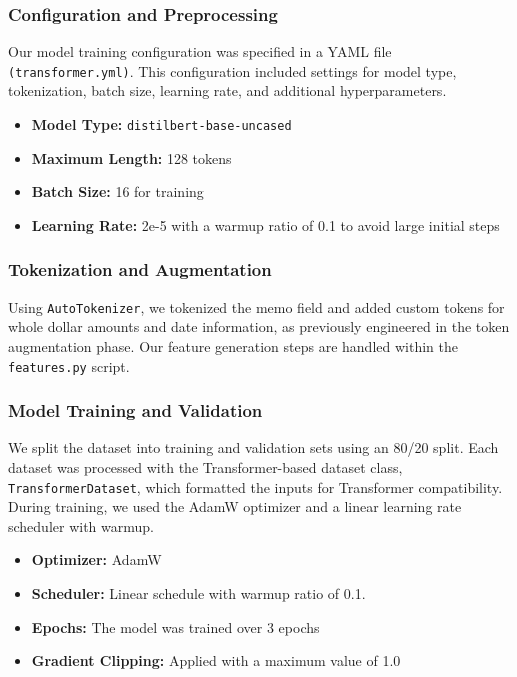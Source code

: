 \documentclass[12pt,letterpaper]{article}
\begin{document}
\subsubsection{Configuration and Preprocessing}
Our model training configuration was specified in a YAML file \texttt{(transformer.yml)}. This configuration included settings for model type, tokenization, batch size, learning rate, and additional hyperparameters.

\begin{itemize}
    \item \textbf{Model Type:} \texttt{distilbert-base-uncased}
    \item \textbf{Maximum Length:} 128 tokens
    \item \textbf{Batch Size:} 16 for training
    \item \textbf{Learning Rate:} 2e-5 with a warmup ratio of 0.1 to avoid large initial steps
\end{itemize}

\subsubsection{Tokenization and Augmentation}
Using \texttt{AutoTokenizer}, we tokenized the memo field and added custom tokens for whole dollar amounts and date information, as previously engineered in the token augmentation phase. Our feature generation steps are handled within the \texttt{features.py} script.

\subsubsection{Model Training and Validation}
We split the dataset into training and validation sets using an 80/20 split. Each dataset was processed with the Transformer-based dataset class, \texttt{TransformerDataset}, which formatted the inputs for Transformer compatibility. During training, we used the AdamW optimizer and a linear learning rate scheduler with warmup.

\begin{itemize}
    \item \textbf{Optimizer:} AdamW
    \item \textbf{Scheduler:} Linear schedule with warmup ratio of 0.1.
    \item \textbf{Epochs:} The model was trained over 3 epochs
    \item \textbf{Gradient Clipping:} Applied with a maximum value of 1.0
\end{itemize}
\end{document}
